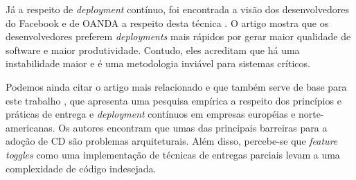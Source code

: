 Já a respeito de \emph{deployment} contínuo, foi encontrada a visão dos desenvolvedores do Facebook e de OANDA a respeito desta técnica \cite{savor2015}. O artigo mostra que os desenvolvedores preferem \emph{deployments} mais rápidos por gerar maior qualidade de software e maior produtividade. Contudo, eles acreditam que há uma instabilidade maior e é uma metodologia inviável para sistemas críticos.

Podemos ainda citar o artigo mais relacionado e que também serve de base para este trabalho \cite{empiricalStudy2016}, que apresenta uma pesquisa empírica a respeito dos princípios e práticas de entrega e \emph{deployment} contínuos em empresas européias e norte-americanas. Os autores encontram que umas das principais barreiras para a adoção de CD são problemas arquiteturais. Além disso, percebe-se que \emph{feature toggles} como uma implementação de técnicas de entregas parciais levam a uma complexidade de código indesejada.
